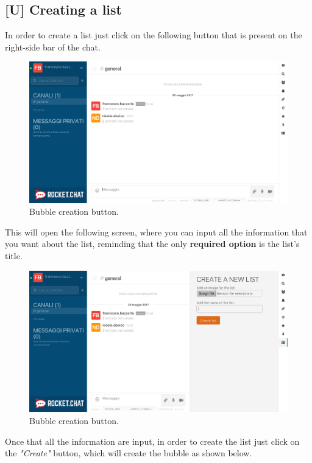 \newpage
\subsection{[U] Creating a list}
In order to create a list just click on the following button that is present on the right-side bar of the chat.

\begin{figure}[H]
  \centering 
  \includegraphics[width=\textwidth]{Sections/3-HowToUse/Images/channel_empty.png}
  \caption{Bubble creation button.}
\end{figure}

This will open the following screen, where you can input all the information that you want about the list, reminding that the only \textbf{required option} is the list's title.

\begin{figure}[H]
  \centering 
  \includegraphics[width=\textwidth]{Sections/3-HowToUse/Images/list_create.png}
  \caption{Bubble creation button.}
\end{figure}

Once that all the information are input, in order to create the list just click on the \textit{"Create"} button, which will create the bubble as shown below.

